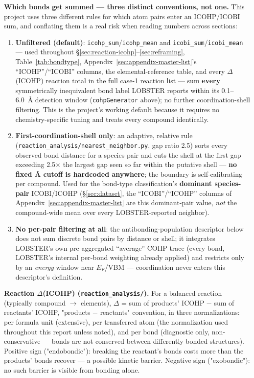 \documentclass[11pt,a4paper]{article}
\begin{document}
\textbf{Which bonds get summed --- three distinct conventions, not one.}
This project uses three different rules for which atom pairs enter an
ICOHP/ICOBI sum, and conflating them is a real risk when reading numbers
across sections:
\begin{enumerate}
\item \textbf{Unfiltered (default)}: \texttt{icohp\_sum}/\texttt{icohp\_mean}
  and \texttt{icobi\_sum}/\texttt{icobi\_mean} --- used throughout
  \S\ref{sec:reaction-icohp}--\ref{sec:reframing}, Table~\ref{tab:bondtype},
  Appendix~\ref{sec:appendix-master-list}'s ``ICOHP''/``ICOBI'' columns,
  the elemental-reference table, and every $\Delta$(ICOHP) reaction total
  in the full case-1 reaction list --- sum \textbf{every} symmetrically
  inequivalent bond label LOBSTER reports within its 0.1--6.0~\AA{}
  detection window (\texttt{cohpGenerator} above); no further
  coordination-shell filtering. This is the project's working default
  because it requires no chemistry-specific tuning and treats every
  compound identically.
\item \textbf{First-coordination-shell only}: an adaptive, relative rule
  (\texttt{reaction\_analysis/nearest\_neighbor.py}, gap ratio 2.5) sorts
  every observed bond distance for a species pair and cuts the shell at
  the first gap exceeding 2.5$\times$ the largest gap seen so far within
  the putative shell --- \textbf{no fixed \AA{} cutoff is hardcoded
  anywhere}; the boundary is self-calibrating per compound. Used for the
  bond-type classification's \textbf{dominant species-pair} ICOBI/ICOHP
  (\S\ref{sec:dataset}, the ``ICOBI''/``ICOHP'' columns of
  Appendix~\ref{sec:appendix-master-list} are this dominant-pair value,
  \emph{not} the compound-wide mean over every LOBSTER-reported neighbor).
\item \textbf{No per-pair filtering at all}: the antibonding-population
  descriptor below does not sum discrete bond pairs by distance or shell;
  it integrates LOBSTER's own pre-aggregated ``average'' COHP trace (every
  bond, LOBSTER's internal per-bond weighting already applied) and
  restricts only by an \emph{energy} window near $E_F$/VBM --- coordination
  never enters this descriptor's definition.
\end{enumerate}

\textbf{Reaction $\Delta$(ICOHP) (\texttt{reaction\_analysis/}).} For a
balanced reaction (typically compound $\to$ elements), $\Delta$ = sum of
products' ICOHP $-$ sum of reactants' ICOHP, "products $-$ reactants"
convention, in three normalizations: per formula unit (extensive), per
transferred atom (the normalization used throughout this report unless
noted), and per bond (diagnostic only, non-conservative --- bonds are
not conserved between differently-bonded structures). Positive sign
("endobondic"): breaking the reactant's bonds costs more than the
products' bonds recover --- a possible kinetic barrier. Negative sign
("exobondic"): no such barrier is visible from bonding alone.
\end{document}
